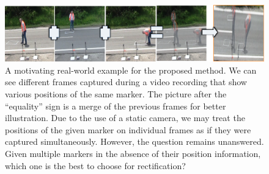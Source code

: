 \begin{figure}[t]
    \centerline{\includegraphics[width=\linewidth]{figures/homography/markers_on_the_road.png}}
    \caption[Multiple markers on the road]{A motivating real-world example for the proposed method. We can see different frames captured during a video recording that show various positions of the same marker. The picture after the ``equality'' sign is a merge of the previous frames for better illustration. Due to the use of a static camera, we may treat the positions of the given marker on individual frames as if they were captured simultaneously. However, the question remains unanswered. Given multiple markers in the absence of their position information, which one is the best to choose for rectification?}
    \label{fig:MultipleMarkersOnRoad}
\end{figure}